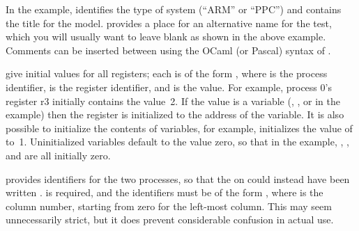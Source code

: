 \begin{fcvref}
In the example,  identifies the type of system (``ARM'' or
``PPC'') and contains the title for the model.
 provides a place for an
alternative name for the test, which you will usually want to leave
blank as shown in the above example.
Comments can be inserted between
 using the OCaml (or Pascal) syntax of \nbco{(* *)}.

 give initial values for all registers;
each is of the form
, where  is the process identifier,  is the register
identifier, and  is the value.
For example, process 0's register r3 initially contains the value~2.
If the value is a variable (, , or  in the example)
then the register is initialized to the address of the variable.
It is also possible to initialize the contents of variables, for example,
 initializes the value of  to~1.
Uninitialized variables default to the value zero, so that in the
example, , , and  are all initially zero.

 provides identifiers for the two processes, so that
the  on  could instead have been written
.
 is required, and the identifiers must be of the form
, where  is the column number, starting from zero for
the left-most column.
This may seem unnecessarily strict, but it does prevent considerable
confusion in actual use.
\end{fcvref}

\QuickQuizEnd

